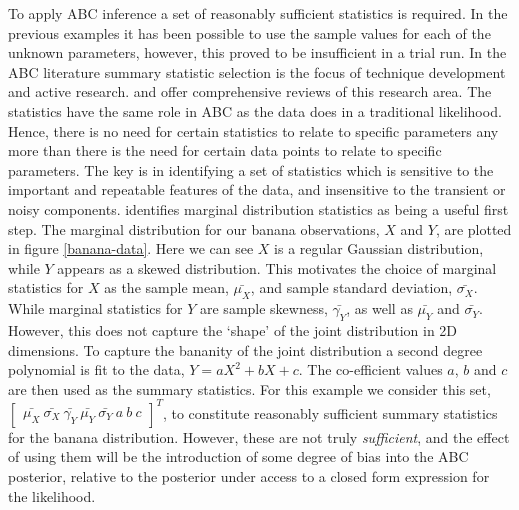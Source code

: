 To apply ABC inference a set of reasonably sufficient statistics is required. In the previous examples it has been possible to use the sample values for each of the unknown parameters, however, this proved to be insufficient in a trial run. In the ABC literature summary statistic selection is the focus of technique development and active research. \citet{Blum2013} and \citet{Prangle2017} offer comprehensive reviews of this research area. The statistics have the same role in ABC as the data does in a traditional likelihood. Hence, there is no need for certain statistics to relate to specific parameters any more than there is the need for certain data points to relate to specific parameters. The key is in identifying a set of statistics which is sensitive to the important and repeatable features of the data, and insensitive to the transient or noisy components. \citet{Wood2010} identifies marginal distribution statistics as being a useful first step. The marginal distribution for our banana observations, $X$ and $Y$, are plotted in figure \ref{banana-data}. Here we can see $X$ is a regular Gaussian distribution, while $Y$ appears as a skewed distribution. This motivates the choice of marginal statistics for $X$ as the sample mean, $\bar{\mu_X}$, and sample standard deviation, $\bar{\sigma_X}$. While marginal statistics for $Y$ are sample skewness, $\bar{\gamma_Y}$, as well as $\bar{\mu_Y}$ and $\bar{\sigma_Y}$. However, this does not capture the `shape' of the joint distribution in 2D dimensions. To capture the bananity of the joint distribution a second degree polynomial is fit to the data, $Y = aX^2 + bX + c$. The co-efficient values $a$, $b$ and $c$ are then used as the summary statistics. For this example we consider this set, $\begin{bmatrix}
\bar{\mu_X}\ \bar{\sigma_X}\ \bar{\gamma_Y}\ \bar{\mu_Y}\ \bar{\sigma_Y}\ a\ b\ c
\end{bmatrix}^T$, to constitute reasonably sufficient summary statistics for the banana distribution. However, these are not truly \textit{sufficient}, and the effect of using them will be the introduction of some degree of bias into the ABC posterior, relative to the posterior under access to a closed form expression for the likelihood. \par

